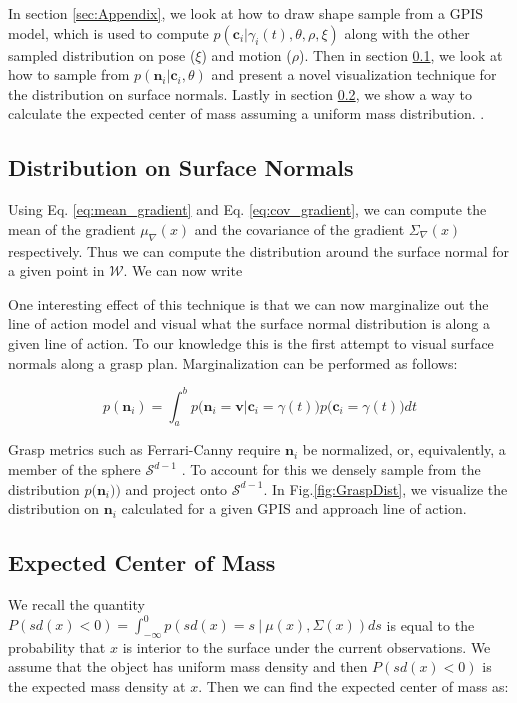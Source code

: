 \documentclass[journal,transmag]{IEEEtran}%
\begin{document}
 In section \ref{sec:Appendix}, we look at how to draw shape sample from a GPIS model, which is used to compute $p(\textbf{c}_i|\gamma_i(t),\theta,\rho,\xi)$ along with the other sampled distribution on pose ($\xi$) and motion ($\rho$). Then in section \ref{sec:normals}, we look at how to sample from $p(\textbf{n}_i|\textbf{c}_i,\theta)$ and present a novel visualization technique for the distribution on surface normals. Lastly in section \ref{sec:mass}, we show a way to calculate the expected center of mass assuming a uniform mass distribution. 
 .
\subsection{Distribution on Surface Normals}\label{sec:normals} 
Using Eq. \ref{eq:mean_gradient} and Eq. \ref{eq:cov_gradient}, we can compute the mean of the gradient $ \mu_{\nabla}(x)$ and the covariance of the gradient $\Sigma_{\nabla}(x)$ respectively. Thus we can compute the distribution around the surface normal for a given point in $\mathcal{W}$. We can now write 

One interesting effect of this technique is that we can now marginalize out the line of action model and visual what the surface normal distribution is along a given line of action. To our knowledge this is the first attempt to visual surface normals along a grasp plan. Marginalization can be performed as follows:

\vspace{-2ex}
\begin{equation}
    p(\textbf{n}_i ) = \int_a^b   p\big(\textbf{n}_i = \textbf{v} | \textbf{c}_i = \gamma(t) \big)p\big(\textbf{c}_i = \gamma(t)\big) dt \label{eq:normal_dist}
\end{equation}

Grasp metrics such as  Ferrari-Canny require $\textbf{n}_i$ be normalized, or, equivalently, a member of the sphere $\mathcal{S}^{d-1}$ \cite{ferrari1992}. To account for this we densely sample from the  distribution $p \big(\textbf{n}_i ) \big)$  and project onto $\mathcal{S}^{d-1}$.  In Fig.\ref{fig:GraspDist}, we visualize the distribution on $\textbf{n}_i$ calculated for a given GPIS and approach line of action.


\subsection{Expected Center of Mass}\label{sec:mass} 

We recall the quantity $P(sd(x) < 0) = \int_{-\infty}^{0} p(sd(x) =  s \ | \ \mu(x),\Sigma(x)) ds$ is equal to the probability that $x$ is interior to the surface under the current observations.
We assume that the object has uniform mass density and then $P(sd(x) < 0)$ is the expected mass density at $x$.
Then we can find the expected center of mass as:
\end{document}
